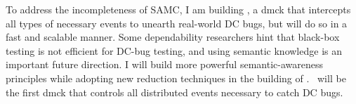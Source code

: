 \documentclass[10pt]{article}
\begin{document}

To address the incompleteness of SAMC, I am building \fullcheck, a dmck that
intercepts all types of necessary events to unearth real-world DC bugs, but will
do so in a fast and scalable manner. Some dependability researchers hint that
black-box testing is not efficient for DC-bug testing, and using semantic
knowledge is an important future direction. I will build more powerful
semantic-awareness principles while adopting new reduction techniques in the
building of \fullcheck. \fullcheck\ will be the first dmck that controls all
distributed events necessary to catch DC bugs.



\end{document}
